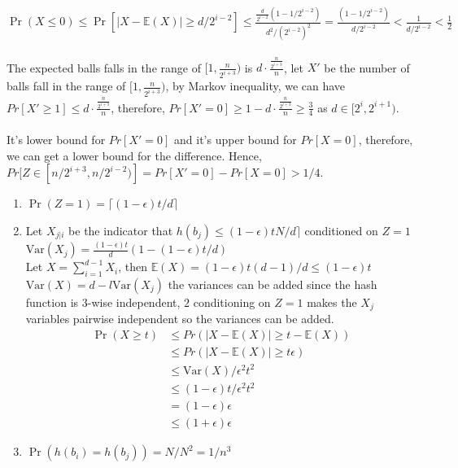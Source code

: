 \documentclass[11pt]{article}%
\begin{document}
\begin{questions}[1]
    $\Pr(X \leq 0 ) \leq \Pr[|X - \mathbb{E}(X)| \geq d/2^{i-2}] \leq \frac{\frac{d}{2^{i-2}}(1 - 1/2^{i-2})}{d^2/(2^{i-2})^2} = \frac{(1 - 1/2^{i-2})}{ d/2^{i-2}} < \frac{1}{d/2^{i-2}} < \frac{1}{2} $\\
    \\
    The expected balls falls in the range of $[1,\frac{n}{2^{i+3}})$ is $d \cdot \frac{\frac{n}{2^{i+3}}}{n}$, let $X'$ be the number of balls fall in the range of $[1,\frac{n}{2^{i+3}})$, by Markov inequality, we can have $Pr[X' \geq 1] \leq d \cdot \frac{\frac{n}{2^{i+3}}}{n}$, therefore, $Pr[X' = 0] \geq 1 - d \cdot \frac{\frac{n}{2^{i+3}}}{n} \geq \frac{3}{4}$ as $d \in [2^i, 2^{i+1})$.\\
    \\
    It's lower bound for $Pr[X'=0]$ and it's upper bound for $Pr[X=0]$, therefore, we can get a lower bound for the difference. Hence, $Pr[Z \in [n/2^{i+3}, n/2^{i-2})] = Pr[X' = 0] - Pr[X = 0] > 1/4$.
    \\
    \item
    \begin{enumerate}
    \item  $\Pr(Z = 1) = \lceil (1 - \epsilon)t / d \rceil$ 
    \item Let $X_{j | i}$ be the indicator that $h(b_j) \leq (1 - \epsilon)tN / d \rceil$ conditioned on $Z = 1$ \\
    $\mathrm{Var}(X_j) = \frac{(1 - \epsilon)t}{d}(1 - (1 -  \epsilon)t / d)$ \\
    Let $X = \sum_{i= 1}^{d-1} X_i$, then $\mathbb{E}(X) = (1 - \epsilon)t(d-1)/d \leq (1 - \epsilon)t$ $\mathrm{Var}(X) = d - l \mathrm{Var}(X_j)$ the variances can be added since the hash function is $3$-wise independent, $2$ conditioning on $Z = 1$ makes the $X_j$ variables pairwise independent so the variances can be added. \\
    \begin{align*}
        \Pr(X \geq t) &\leq Pr(|X - \mathbb{E}(X)| \geq t - \mathbb{E}(X)) \\
        &\leq Pr(|X - \mathbb{E}(X)| \geq t\epsilon)\\
        & \leq \mathrm{Var}(X)/\epsilon^2 t^2 \\
        & \leq (1 - \epsilon)t/\epsilon^2 t^2 \\
        &= (1 - \epsilon)\epsilon \\
        &\leq (1 + \epsilon)\epsilon
    \end{align*}
    \item $\Pr(h(b_i) = h(b_j)) = N/N^2 = 1/n^3$ \\

\end{enumerate}
\end{questions}
\end{document}
